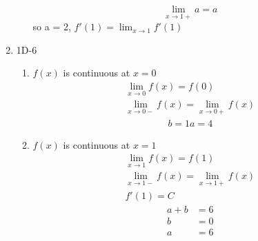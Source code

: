 \documentclass{article}
\begin{document}
\begin{enumerate}
\begin{enumerate}
\begin{equation*}
                \lim_{x \to 1+} a = a
            \end{equation*}
            so a = 2, $f'(1) = \lim_{x \to 1} f'(1)$
    \end{enumerate}
\item 1D-6
    \begin{enumerate}
        \item $f(x)$ is continuous at $x = 0$
            \begin{align*}
                \lim_{x \to 0}f(x) = f(0) \\
                \lim_{x \to 0-}f(x) = \lim_{x \to 0+}f(x)
            \end{align*} 
            \begin{align*}
                b = 1
                a = 4
            \end{align*}
        \item $f(x)$ is continuous at $x = 1$
            \begin{align*}
                \lim_{x \to 1}f(x) = f(1) \\
                \lim_{x \to 1-}f(x) = \lim_{x \to 1+}f(x) \\
                f'(1) = C
            \end{align*} 
            \begin{align*}
                a + b &= 6 \\
                b &= 0 \\
                a &= 6 \\
            \end{align*}
    \end{enumerate}
\end{enumerate}
\end{document}
